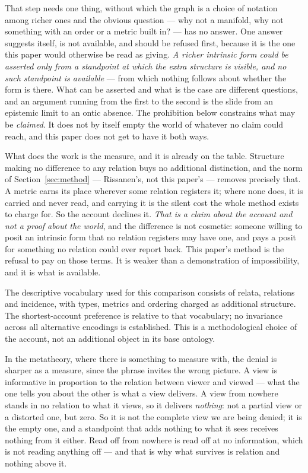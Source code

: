 \documentclass[11pt,a4paper]{article}
\theoremstyle{remark}\newtheorem{remark}[proposition]{Remark}
\begin{document}
That step needs one thing, without which the graph is a choice of notation
among richer ones and the obvious question --- why not a manifold, why not something with an order or a
metric built in? --- has no answer. One answer suggests itself, is not available, and should be refused first, because it is the one this
paper would otherwise be read as giving. \emph{A richer intrinsic form could be asserted only from a
standpoint at which the extra structure is visible, and no such standpoint is available} --- from which
nothing follows about whether the form is there. What can be asserted and what is the case are
different questions, and an argument running from the first to the second is the slide from an
epistemic limit to an ontic absence. The prohibition below constrains what may be \emph{claimed}. It
does not by itself empty the world of whatever no claim could reach, and this paper does not get to
have it both ways.

What does the work is the measure, and it is already on the table. Structure making no difference to
any relation buys no additional distinction, and the norm of Section~\ref{sec:method} --- Rissanen's,
not this paper's --- removes precisely that. A metric earns its place wherever some relation registers
it; where none does, it is carried and never read, and carrying it is the silent cost the whole method
exists to charge for. So the account declines it. \emph{That is a claim about the account and not a
proof about the world}, and the difference is not cosmetic: someone willing to posit an intrinsic form
that no relation registers may have one, and pays a posit for something no relation could ever report
back. This paper's method is the refusal to pay on those terms. It is weaker than a demonstration of
impossibility, and it is what is available.

The descriptive vocabulary used for this comparison consists of relata,
relations and incidence, with types, metrics and ordering charged as additional
structure. The shortest-account preference is relative to that vocabulary;
no invariance across all alternative encodings is established. This is a
methodological choice of the account, not an additional object in its base ontology.


In the metatheory, where there is something to measure with, the denial is sharper as a measure, since
the phrase invites the wrong
picture. A view is informative in proportion to the relation between viewer and viewed --- what the one
tells you about the other is what a view delivers. A view from nowhere stands in no relation to what it
views, so it delivers \emph{nothing}: not a partial view or a distorted one, but zero. So it is not the
complete view we are being denied; it is the empty one, and a standpoint that adds nothing to what it
sees receives nothing from it either. Read off from nowhere is read off at no information, which is not
reading anything off --- and that is why what survives is relation and nothing above it.
\end{document}
